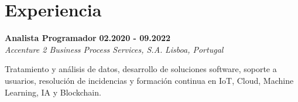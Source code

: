 \documentclass[letterpaper,11pt]{article}
\begin{document}
\section{Experiencia}

    \noindent
    \begin{minipage}[t]{0.99\textwidth}
        {\large \textbf{Analista Programador}} 
        \hfill 
        {\small \textbf{02.2020 - 09.2022}} \\
        
        {\color{detailgray}\textit{Accenture 2 Business Process Services, S.A.}} 
        \hfill 
        {\color{detailgray}\small \textit{Lisboa, Portugal}}
    \end{minipage}
    
    \vspace{0.1cm}
    
    {\small Tratamiento y análisis de datos, desarrollo de soluciones software, soporte a usuarios, resolución de incidencias y formación continua en IoT, Cloud, Machine Learning, IA y Blockchain.}
    
    \vspace{0.4cm}


\end{document}
